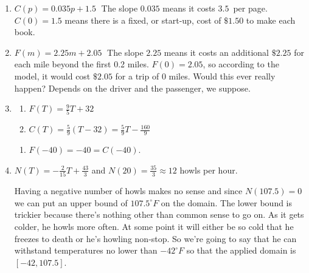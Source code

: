 \begin{enumerate}
\setcounter{enumi}{\value{HW}}

\item  $C(p) = 0.035p + 1.5 \;$  The slope $0.035$ means it costs $3.5$\textcent \, per page.  $C(0) = 1.5$ means there is a fixed, or start-up, cost of $\$1.50$ to make each book.

\item $F(m) = 2.25m + 2.05 \;$  The slope $2.25$ means it costs an additional $\$2.25$ for each mile beyond the first 0.2 miles.  $F(0) = 2.05$, so according to the model, it would cost $\$2.05$ for a trip of $0$ miles.  Would this ever really happen?  Depends on the driver and the passenger, we suppose.


\item   \begin{multicols}{2}

\begin{enumerate}

\item $F(T) = \frac{9}{5}T + 32$
\item $C(T) = \frac{5}{9}(T - 32) = \frac{5}{9}T - \frac{160}{9}$

\setcounter{HWindent}{\value{enumii}}

\end{enumerate}

\end{multicols}

\begin{enumerate}
\setcounter{enumii}{\value{HWindent}}

\item $F(-40) = -40 = C(-40)$.

\end{enumerate}



\item $N(T) = -\frac{2}{15}T + \frac{43}{3}$  and $N(20) = \frac{35}{3} \approx 12$ howls per hour.

Having a negative number of howls makes no sense and since $N(107.5) = 0$ we can put an upper bound of $107.5^{\circ}F$ on the domain.  The lower bound is trickier because there's nothing other than common sense to go on.  As it gets colder, he howls more often.  At some point it will either be so cold that he freezes to death or he's howling non-stop.  So we're going to say that he can withstand temperatures no lower than $-42^{\circ}F$ so that the applied domain is $[-42, 107.5]$.


\end{enumerate}
